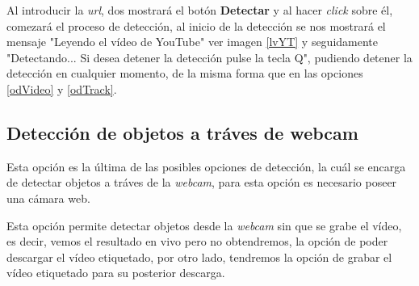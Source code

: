 
Al introducir la \textit{url}, dos mostrará el botón \textbf{Detectar} y al hacer \textit{click} sobre él, comezará el proceso de detección, al inicio de la detección
se nos mostrará el mensaje "Leyendo el vídeo de YouTube" ver imagen \ref{lvYT} y seguidamente "Detectando... Si desea detener la detección pulse la tecla Q", pudiendo detener la detección en cualquier momento, de la misma forma que en las opciones \ref{odVideo} y \ref{odTrack}.


\subsection{Detección de objetos a tráves de webcam}
Esta opción es la última de las posibles opciones de detección, la cuál se encarga de detectar objetos a tráves de la \textit{webcam}, para esta opción es necesario poseer una cámara web.


Esta opción permite detectar objetos desde la \textit{webcam} sin que se grabe el vídeo, es decir, vemos el resultado en vivo pero no obtendremos, la opción de poder descargar el vídeo etiquetado, por otro lado, tendremos la opción de grabar el vídeo etiquetado para su posterior descarga.